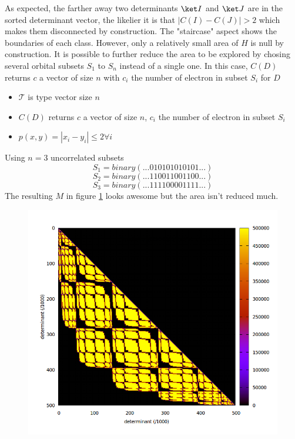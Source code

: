 As expected, the farther away two determinants $\ket I$ and $\ket J$ are in the sorted determinant vector, the likelier it is that $|C(I)-C(J)| > 2$ which makes them disconnected by construction. The "staircase" aspect shows the boundaries of each class.
However, only a relatively small area of $H$ is null by construction. It is possible to further reduce the area to be explored by chosing several orbital subsets $S_1$ to $S_n$ instead of a single one. In this case, $C(D)$ returns $c$ a vector of size $n$ with $c_{i}$ the number of electron in subset $S_i$ for $D$

\begin{itemize}
	\item
	$\mathcal{T}$ is type vector size $n$
	\item
	$C(D)$ returns $c$ a vector of size $n$, $c_i$ the number of electron in subset $S_i$
	\item
	$p(x, y) = |x_i - y_i| \leq 2 \forall i$
\end{itemize}



Using $n=3$ uncorrelated subsets
\begin{equation}
S_1 = binary(...010101010101...)
\end{equation}
\begin{equation}
S_2 = binary(...110011001100...)
\end{equation}
\begin{equation}
S_3 = binary(...111100001111...)
\end{equation}
The resulting $M$ in figure \ref{fig:num_subspace3} looks awesome but the area isn't reduced much.

\begin{figure}[h!]
	\begin{center}
		\includegraphics[width=0.6\columnwidth]{figures/davidson/num_subspace3}
		\caption{{\label{fig:num_subspace3}
		}}
	\end{center}
\end{figure}


